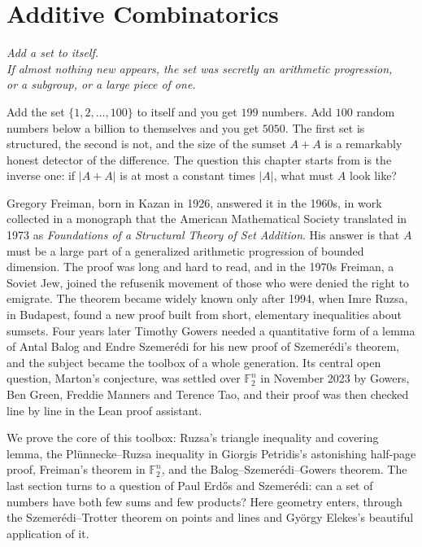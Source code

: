 \chapter{Additive Combinatorics}
\begin{center}\itshape
Add a set to itself.\\
If almost nothing new appears, the set was secretly an arithmetic progression,\\
or a subgroup, or a large piece of one.
\end{center}

Add the set $\{1,2,\dots,100\}$ to itself and you get $199$ numbers. Add $100$ random numbers below a billion to themselves and you get $5050$. The first set is structured, the second is not, and the size of the sumset $A+A$ is a remarkably honest detector of the difference. The question this chapter starts from is the inverse one: if $|A+A|$ is at most a constant times $|A|$, what must $A$ look like?

Gregory Freiman, born in Kazan in 1926, answered it in the 1960s, in work collected in a monograph that the American Mathematical Society translated in 1973 as \emph{Foundations of a Structural Theory of Set Addition}. His answer is that $A$ must be a large part of a generalized arithmetic progression of bounded dimension. The proof was long and hard to read, and in the 1970s Freiman, a Soviet Jew, joined the refusenik movement of those who were denied the right to emigrate. The theorem became widely known only after 1994, when Imre Ruzsa, in Budapest, found a new proof built from short, elementary inequalities about sumsets. Four years later Timothy Gowers needed a quantitative form of a lemma of Antal Balog and Endre Szemerédi for his new proof of Szemerédi's theorem, and the subject became the toolbox of a whole generation. Its central open question, Marton's conjecture, was settled over $\mathbb F_2^n$ in November 2023 by Gowers, Ben Green, Freddie Manners and Terence Tao, and their proof was then checked line by line in the Lean proof assistant.

We prove the core of this toolbox: Ruzsa's triangle inequality and covering lemma, the Plünnecke--Ruzsa inequality in Giorgis Petridis's astonishing half-page proof, Freiman's theorem in $\mathbb F_2^n$, and the Balog--Szemerédi--Gowers theorem. The last section turns to a question of Paul Erdős and Szemerédi: can a set of numbers have both few sums and few products? Here geometry enters, through the Szemerédi--Trotter theorem on points and lines and György Elekes's beautiful application of it.

